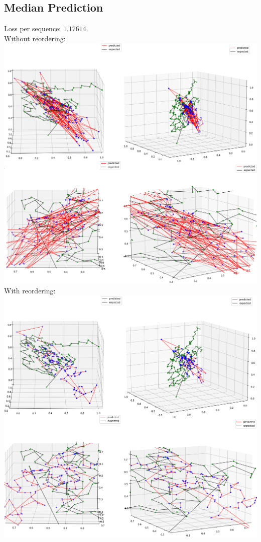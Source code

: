 \documentclass[11pt]{article}
\newcommand{\np}{\newpage}
\begin{document}
\subsection{Median Prediction}
Loss per sequence: $1.17614$.\\[3mm]
Without reordering:\\[2mm]
\includegraphics[scale=0.42]{med1.png}\np
With reordering:\\[2mm]
\includegraphics[scale=0.42]{med2.png}\np
\end{document}
